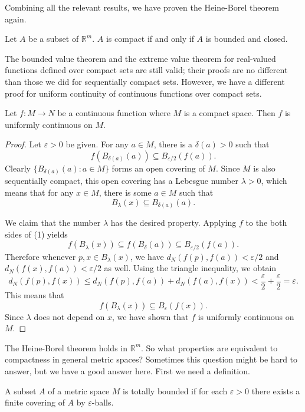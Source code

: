 Combining all the relevant results, we have proven the Heine-Borel theorem again.
\begin{thm}
  Let $A$ be a subset of $\mathbb{R}^m$.
  $A$ is compact if and only if $A$ is bounded and closed.
\end{thm}

The bounded value theorem and the extreme value theorem for real-valued functions defined over compact sets are still valid; their proofs are no different than those we did for sequentially compact sets.
However, we have a different proof for uniform continuity of continuous functions over compact sets.

\begin{thm}
  Let $f: M \to N$ be a continuous function where $M$ is a compact space.
  Then $f$ is uniformly continuous on $M$.
\end{thm}

\begin{proof}
  Let $\varepsilon > 0$ be given.
  For any $a \in M$, there is a $\delta(a) > 0$ such that
  \[
    f(B_{\delta(a)}(a)) \subseteq B_{\varepsilon/2}(f(a)).
  \]
  Clearly $\{ B_{\delta(a)}(a) \colon a \in M \}$ forms an open covering of $M$.    Since $M$ is also sequentially compact, this open covering has a Lebesgue number $\lambda > 0$, which means that for any $x \in M$, there is some $a \in M$ such that
  \[
    \tag{1}
    B_\lambda(x) \subseteq B_{\delta(a)}(a).
  \]
  
  We claim that the number $\lambda$ has the desired property.
  Applying $f$ to the both sides of (1) yields
  \[
    f(B_\lambda(x)) \subseteq f(B_{\delta}(a)) \subseteq B_{\varepsilon/2}(f(a)).
  \]
  Therefore whenever $p, x \in B_\lambda(x)$, we have $d_N(f(p), f(a)) < \varepsilon/2$ and $d_N(f(x), f(a)) < \varepsilon/2$ as well.
  Using the triangle inequality, we obtain
  \[
    d_N( f(p), f(x) ) \leqslant d_N(f(p), f(a)) + d_N( f(a), f(x) ) < \frac{\varepsilon}{2} + \frac{\varepsilon}{2} = \varepsilon.
  \]
  This means that
  \[
    f(B_\lambda(x)) \subseteq B_\varepsilon(f(x)).
  \]
  Since $\lambda$ does not depend on $x$, we have shown that $f$ is uniformly continuous on $M$.
\end{proof}

The Heine-Borel theorem holds in $\mathbb{R}^m$.
So what properties are equivalent to compactness in general metric spaces?
Sometimes this question might be hard to answer,
but we have a good answer here.
First we need a definition.

\begin{defn}
  A subset $A$ of a metric space $M$ is \textsf{totally bounded} if for each $\varepsilon > 0$ there exists a finite covering of $A$ by $\varepsilon$-balls.
\end{defn}

